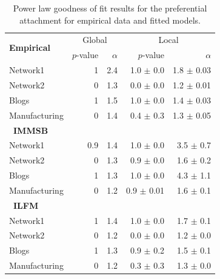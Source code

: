 \begin{table}[t]
    \caption{Power law goodness of fit results for the preferential attachment for empirical data and fitted models.}
\centering
  \begin{tabular}{lrrrr}
      \multirow{2}{*}{\textbf{Empirical}}  &
      \multicolumn{2}{c}{Global} & \multicolumn{2}{c}{Local}\\
      \cmidrule(r){2-3} \cmidrule(l){4-5}
      &   $p$-value &   $\alpha$   & $p$-value & $\alpha$   \\
  	\hline
    Network1       & 1 & 2.4 &   1.0 $\pm$ 0.0  &  1.8 $\pm$ 0.03  \\
    Network2       & 0 & 1.3 &   0.0 $\pm$ 0.0  &  1.2 $\pm$ 0.01 \\
    Blogs          & 1 & 1.5 &   1.0 $\pm$ 0.0  &  1.4 $\pm$ 0.03\\
    Manufacturing  & 0 & 1.4 &   0.4 $\pm$ 0.3  &  1.3 $\pm$ 0.05 \\
  	\hline

      \ \textbf{IMMSB} &&&& \\
  	\hline
    Network1       & 0.9 & 1.4 &   1.0 \(\pm\) 0.0   &  3.5 \(\pm\) 0.7 \\
    Network2       & 0 & 1.3 &   0.9 \(\pm\) 0.0   &  1.6 \(\pm\) 0.2 \\
    Blogs          & 1 & 1.3 &   1.0 \(\pm\) 0.0   &  4.3 \(\pm\) 1.1 \\
    Manufacturing  & 0 & 1.2 &   0.9 \(\pm\) 0.01  &  1.6 \(\pm\) 0.1 \\
  	\hline

      \ \textbf{ILFM} &&&& \\
  	\hline
    Network1      & 1 & 1.4 &   1.0 \(\pm\) 0.0  &  1.7 \(\pm\) 0.1 \\
    Network2      & 0 & 1.2 &   0.0 \(\pm\) 0.0 &  1.2 \(\pm\) 0.0 \\
    Blogs         & 1 & 1.3 &   0.9 \(\pm\) 0.2  &  1.5 \(\pm\) 0.1 \\
    Manufacturing & 0 & 1.2 &   0.3 \(\pm\) 0.3  &  1.3 \(\pm\) 0.0 \\
  	\hline
  \end{tabular}
\label{table:me_gofit}
\end{table}


